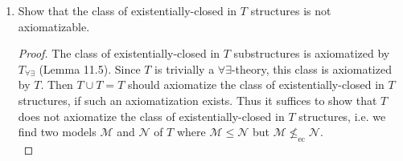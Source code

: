 \documentclass{article}
\begin{document}
\begin{enumerate}[label={\bf Q\arabic*:}]
\begin{enumerate}
        \begin{proof}
          Let $\mathcal{L}'=\mathcal{L}(\mathcal{M})\cup\{b\}$, where $b$
          is a constant that does not appear in $\mathcal{L}(\mathcal{M})$.
          Let
          \[\begin{array}{rrl}
            T' &:= &T_\mathcal{M} \\
              &&\cup \{c_m\neq c_n:m\neq n\in M\} \\
              &&\cup\{R(c_m,b):m\in R(M,a)\} \\
              &&\cup\{b\neq f^n(a):n\in\mathbb{N}\}
          \end{array}\]
          be a theory in the language $\mathcal{L}'$. We show that
          $T'$ is finitely satisfied by $\mathcal{M}$: Assign each $c_m$ to
          $m\in M$. Then clearly $\mathcal{M}$ satisfies all sentences in
          $T_\mathcal{M}$ and also formulas of the form $c_m\neq c_n\in
          T'$ by definition. Given a finite set of formulas
          $\{b\neq f^{0}(a),\ldots,b\neq f^{n}(a)\}\subset T'$, assign $b$
          to $f^{n+1}(a)\in M$. This assignment will satisfy formulas of
          the form $R(c_m,b)\in T'$ for each $m\in R(M,a)$ because $R(m,a)$
          implies $R(m,f^{n+1}(a))$ by induction on $n$. Also, since
          $f^{n+1}(a)\neq f^i(a)$ for all $i<n+1$, the assignment will also
          satisfy the chosen finite set of formulas. \\

          Thus by Compactness theorem $T'$ is satisfied by some model
          $\mathcal{N}$. Then since $T\subset T'$ and $T_\mathcal{M}\subset
          T'$, $\mathcal{N}$ is an elementary extension of $\mathcal{M}$ in
          the original language $\mathcal{L}$, and also
          $\mathcal{N}\models\forall x\; [R(x,a)\rightarrow R(x,b)]$ by our
          choice of $T'$.
        \end{proof}

      \item Show that the class of existentially-closed in $T$ structures
        is not axiomatizable.
        \begin{proof}
          The class of existentially-closed in $T$ substructures is
          axiomatized by $T_{\forall\exists}$ (Lemma 11.5). Since $T$ is
          trivially a $\forall\exists$-theory, this class is axiomatized by
          $T$. Then $T\cup T=T$ should axiomatize the class of
          existentially-closed in $T$ structures, if such an axiomatization
          exists. Thus it suffices to show that $T$ does not axiomatize the
          class of existentially-closed in $T$ structures, i.e. we find two
          models $\mathcal{M}$ and $\mathcal{N}$ of $T$ where
          $\mathcal{M}\leq\mathcal{N}$ but
          $\mathcal{M}\not\leq_{\text{ec}}\mathcal{N}$. \\


\end{proof}
\end{enumerate}
\end{enumerate}
\end{document}

